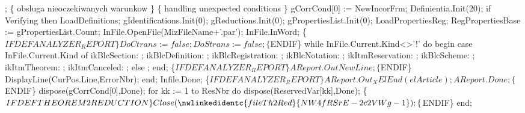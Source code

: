    ;
   \{ obsluga nieoczekiwanych warunkow \}
   \{ handling unexpected conditions \}
   gCorrCond[0] := NewIncorFrm;
   Definientia.Init(20);
   if Verifying then LoadDefinitions;
   gIdentifications.Init(0);
   gReductions.Init(0);
   gPropertiesList.Init(0);
   LoadPropertiesReg;
   RegPropertiesBase := gPropertiesList.Count;
   InFile.OpenFile(MizFileName+'.par');
   InFile.InWord;
   \{$IFDEF ANALYZER_REPORT\}
   DoCtrans := false; DoStrans := false;
   \{$ENDIF\}
   while InFile.Current.Kind<>'!' do
   begin
      case InFile.Current.Kind of
         ikBlcSection: ;
         ikBlcDefinition: ;
         ikBlcRegistration: ;
         ikBlcNotation: ;
         ikItmReservation: ;
         ikBlcScheme: ;
         ikItmTheorem: ;
         ikItmCanceled: ;
      else ;
      end;
      \{$IFDEF ANALYZER_REPORT\}
      AReport.OutNewLine;
      \{$ENDIF\}
      DisplayLine(CurPos.Line,ErrorNbr);
   end;
   Infile.Done;
   \{$IFDEF ANALYZER_REPORT\}
   AReport.Out_XElEnd(elArticle);
   AReport.Done;
   \{$ENDIF\}
   dispose(gCorrCond[0],Done);
   for kk := 1 to ResNbr do dispose(ReservedVar[kk],Done);
   \{$IFDEF THEOREM2REDUCTION\}
   Close(\nwlinkedidentc{fileTh2Red}{NW4fRSrE-2c2VWg-1});
   \{$ENDIF\}
end;
\eatline

